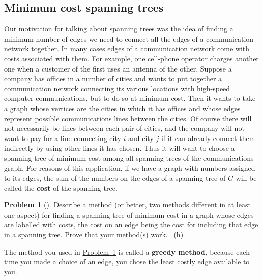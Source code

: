 \documentclass[10pt,]{book}
\newcommand{\terminology}[1]{\textbf{#1}}
\theoremstyle{plain}
\theoremstyle{definition}
\newtheorem{activity}[project]{Problem}
\theoremstyle{definition}
\numberwithin{equation}{chapter}
\newcommand{\importantarrow}{\Rightarrow}
\begin{document}
\subsection[{Minimum cost spanning trees}]{Minimum cost spanning trees}\label{subsection-25}
\hypertarget{p-659}{}%
Our motivation for talking about spanning trees was the idea of finding a minimum number of edges we need to connect all the edges of a communication network together. In many cases edges of a communication network come with costs associated with them. For example, one cell-phone operator charges another one when a customer of the first uses an antenna of the other. Suppose a company has offices in a number of cities and wants to put together a communication network connecting its various locations with high-speed computer communications, but to do so at minimum cost. Then it wants to take a graph whose vertices are the cities in which it has offices and whose edges represent possible communications lines between the cities. Of course there will not necessarily be lines between each pair of cities, and the company will not want to pay for a line connecting city \(i\) and city \(j\) if it can already connect them indirectly by using other lines it has chosen. Thus it will want to choose a spanning tree of minimum cost among all spanning trees of the communications graph. For reasons of this application, if we have a graph with numbers assigned to its edges, the sum of the numbers on the edges of a spanning tree of \(G\) will be called the \terminology{cost} of the spanning tree.%
\begin{activity}[]\marginsymbol[-1em]{\pdftooltip{$\importantarrow$}{especially interesting}} \label{mincostspantree}
\hypertarget{p-660}{}%
Describe a method (or better, two methods different in at least one aspect) for finding a spanning tree of minimum cost in a graph whose edges are labelled with costs, the cost on an edge being the cost for including that edge in a spanning tree. Prove that your method(s) work.%
~{\tiny (h)}\end{activity}
\hypertarget{p-665}{}%
The method you used in \hyperref[mincostspantree]{Problem~\ref{mincostspantree}} is called a \terminology{greedy method}, because each time you made a choice of an edge, you chose the least costly edge available to you.%
\typeout{************************************************}
\typeout{************************************************}
\end{document}
